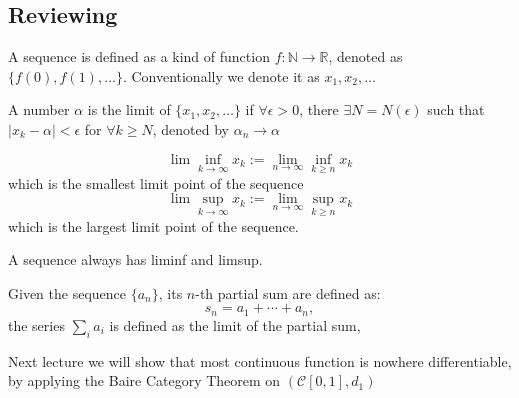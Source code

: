 \subsection{Reviewing}
\begin{definition}[Sequence]
A sequence is defined as a kind of function $f:\mathbb{N}\to\mathbb{R}$, denoted as $\{f(0), f(1),\dots\}$. Conventionally we denote it as $x_1,x_2,\dots$
\end{definition}
\begin{definition}[Limit]
A number $\alpha$ is the limit of $\{x_1,x_2,\dots\}$ if $\forall\epsilon>0$, there $\exists N = N(\epsilon)$ such that $|x_k-\alpha|<\epsilon$ for $\forall k\ge N$, denoted by $\alpha_n\to\alpha$
\end{definition}
\begin{definition}
\[
\lim\inf_{k\to\infty}x_k :=\lim_{n\to\infty}\inf_{k\ge n}x_k
\]
which is the smallest limit point of the sequence
\[
\lim\sup_{k\to\infty}x_k :=\lim_{n\to\infty}\sup_{k\ge n}x_k
\]
which is the largest limit point of the sequence.
\end{definition}
A sequence always has liminf and limsup.
\begin{definition}
Given the sequence $\{a_n\}$, its $n$-th partial sum are defined as:
\[
s_n = a_1+\cdots+a_n,
\]
the series $\sum_ia_i$ is defined as the limit of the partial sum,
\end{definition}

Next lecture we will show that most continuous function is nowhere differentiable, by applying the Baire Category Theorem on $(\mathcal{C}[0,1],d_1)$







